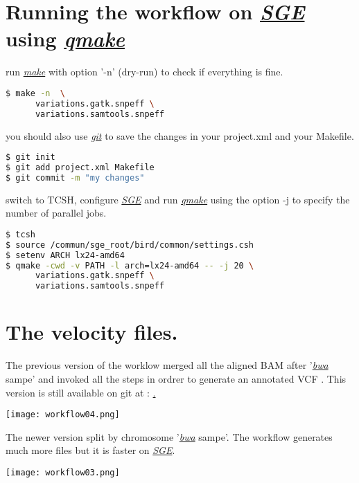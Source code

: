 \documentclass{article}
\newcommand{\sge}{\href{http://gridscheduler.sourceforge.net}{\em{SGE}}}
\newcommand{\git}{\href{https://github.com/}{\em{git}}}
\newcommand{\qmake}{\href{http://gridscheduler.sourceforge.net/htmlman/htmlman1/qmake.html}{\em{qmake}}}
\newcommand{\make}{\href{http://www.gnu.org/software/make/manual/make.html}{\em{make}}}
\newcommand{\bwa}{\href{http:/todo.org/}{\em{bwa}}}
\newcommand{\VCF}{VCF}
\begin{document}
\section{Running the workflow on \sge{} using \qmake{}}
run \make{} with option '-n' (dry-run) to check if everything is fine.
\begin{lstlisting}[language=bash]
$ make -n  \
      variations.gatk.snpeff \
      variations.samtools.snpeff
\end{lstlisting}

you should also use \git{} to save the changes in your project.xml and your Makefile.
\begin{lstlisting}[language=bash]
$ git init
$ git add project.xml Makefile
$ git commit -m "my changes"
\end{lstlisting}
switch to TCSH, configure \sge{} and run \qmake{} using the option -j to specify the number of parallel jobs.
\begin{lstlisting}[language=bash]
$ tcsh
$ source /commun/sge_root/bird/common/settings.csh
$ setenv ARCH lx24-amd64
$ qmake -cwd -v PATH -l arch=lx24-amd64 -- -j 20 \
      variations.gatk.snpeff \
      variations.samtools.snpeff
\end{lstlisting}

\section{The velocity files.}
The previous version of the worklow merged all the aligned BAM after '\bwa{} sampe' and invoked all the steps in ordrer to generate an
annotated \VCF{} . This version is still available on git at : \href{http://github.com/todo}.
\begin{center}
\texttt{[image: workflow04.png]}
\end{center}
The newer version split by chromosome  '\bwa{} sampe'. The workflow generates much more files but it is faster on \sge{}.
\begin{center}
\texttt{[image: workflow03.png]}
\end{center}
\end{document}
